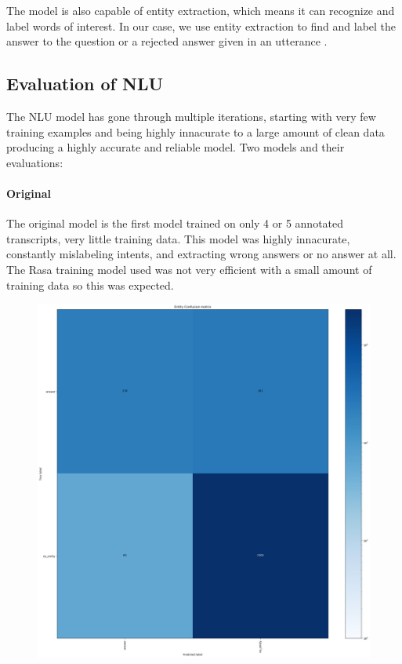 \documentclass[hidelinks, 11pt]{article}
\begin{document}

The model is also capable of entity extraction, which means it can recognize and label words of interest. In our case, we use entity extraction to find and label the answer to the question or a rejected answer given in an utterance .

\subsection{Evaluation of NLU}
\label{subsec:NLU_evaluation}

The NLU model has gone through multiple iterations, starting with very few training examples and being highly innacurate to a large amount of clean data producing a highly accurate and reliable model. Two models and their evaluations:

\paragraph{Original} The original model is the first model trained on only 4 or 5 annotated transcripts, very little training data.
This model was highly innacurate, constantly mislabeling intents, and extracting wrong answers or no answer at all.
The Rasa training model used was not very efficient with a small amount of training data so this was expected.

\begin{figure}
  \includegraphics[width=\columnwidth]{../Rasa/Evaluation/Original_Model/DIETClassifier_confusion_matrix.png}
\end{figure}
\end{document}
